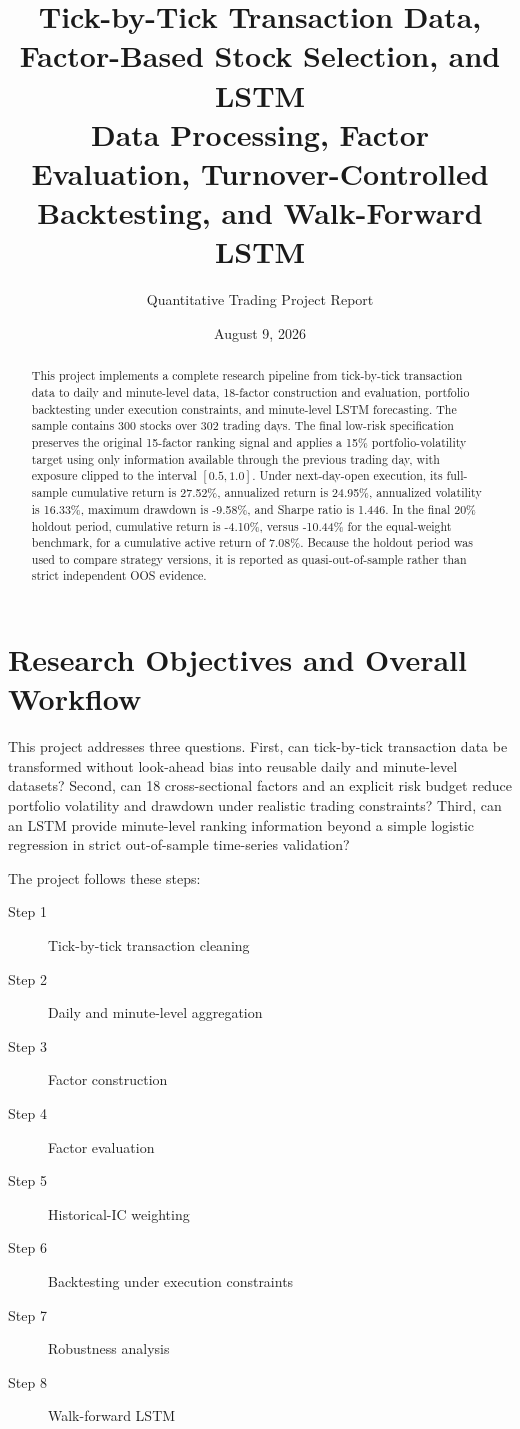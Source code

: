\documentclass[a4paper,11pt,openany]{report}
\title{\textbf{Tick-by-Tick Transaction Data, Factor-Based Stock Selection, and LSTM}\\[0.4em]
\large Data Processing, Factor Evaluation, Turnover-Controlled Backtesting, and Walk-Forward LSTM}
\author{Quantitative Trading Project Report}
\date{August 9, 2026}
\begin{document}
\maketitle

\begin{abstract}
This project implements a complete research pipeline from tick-by-tick transaction data to daily and minute-level data, 18-factor construction and evaluation, portfolio backtesting under execution constraints, and minute-level LSTM forecasting. The sample contains 300 stocks over 302 trading days. The final low-risk specification preserves the original 15-factor ranking signal and applies a 15\% portfolio-volatility target using only information available through the previous trading day, with exposure clipped to the interval $[0.5,1.0]$. Under next-day-open execution, its full-sample cumulative return is 27.52\%, annualized return is 24.95\%, annualized volatility is 16.33\%, maximum drawdown is -9.58\%, and Sharpe ratio is 1.446. In the final 20\% holdout period, cumulative return is -4.10\%, versus -10.44\% for the equal-weight benchmark, for a cumulative active return of 7.08\%. Because the holdout period was used to compare strategy versions, it is reported as quasi-out-of-sample rather than strict independent OOS evidence.
\end{abstract}

\tableofcontents
\clearpage

\chapter{Research Objectives and Overall Workflow}

This project addresses three questions. First, can tick-by-tick transaction data be transformed without look-ahead bias into reusable daily and minute-level datasets? Second, can 18 cross-sectional factors and an explicit risk budget reduce portfolio volatility and drawdown under realistic trading constraints? Third, can an LSTM provide minute-level ranking information beyond a simple logistic regression in strict out-of-sample time-series validation?

\noindent The project follows these steps:
\begin{description}
    \item[Step 1] Tick-by-tick transaction cleaning
    \item[Step 2] Daily and minute-level aggregation
    \item[Step 3] Factor construction
    \item[Step 4] Factor evaluation
    \item[Step 5] Historical-IC weighting
    \item[Step 6] Backtesting under execution constraints
    \item[Step 7] Robustness analysis
    \item[Step 8] Walk-forward LSTM
\end{description}
\end{document}
